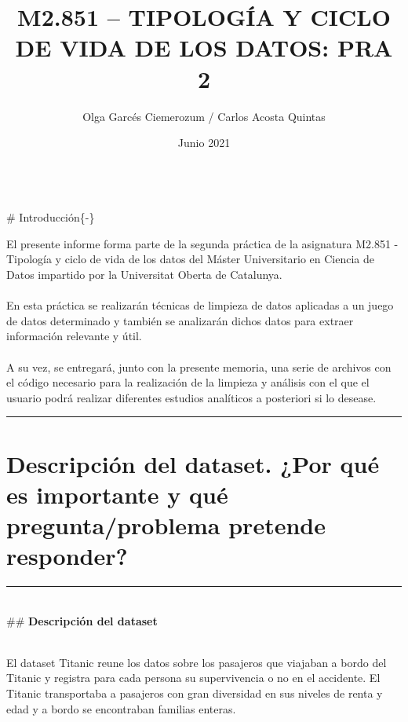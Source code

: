 \documentclass[
]{article}
\title{\textbf{M2.851 -- TIPOLOGÍA Y CICLO DE VIDA DE LOS DATOS: PRA 2}}
\author{Olga Garcés Ciemerozum / Carlos Acosta Quintas}
\date{Junio 2021}
\begin{document}
\maketitle

{
\setcounter{tocdepth}{4}
\tableofcontents
}
\texttt{}

\texttt{}

\texttt{}\\
\# Introducción\{-\}

\texttt{}

El presente informe forma parte de la segunda práctica de la asignatura
M2.851 - Tipología y ciclo de vida de los datos del Máster Universitario
en Ciencia de Datos impartido por la Universitat Oberta de Catalunya.\\
\texttt{}~\\
En esta práctica se realizarán técnicas de limpieza de datos aplicadas a
un juego de datos determinado y también se analizarán dichos datos para
extraer información relevante y útil.\\
\texttt{}~\\
A su vez, se entregará, junto con la presente memoria, una serie de
archivos con el código necesario para la realización de la limpieza y
análisis con el que el usuario podrá realizar diferentes estudios
analíticos a posteriori si lo desease. \texttt{}\\
\texttt{}

\begin{center}\rule{0.5\linewidth}{0.5pt}\end{center}

\hypertarget{descripciuxf3n-del-dataset.-por-quuxe9-es-importante-y-quuxe9-preguntaproblema-pretende-responder}{%
\section{\texorpdfstring{\textbf{Descripción del dataset. ¿Por qué es
importante y qué pregunta/problema pretende
responder?}}{Descripción del dataset. ¿Por qué es importante y qué pregunta/problema pretende responder?}}\label{descripciuxf3n-del-dataset.-por-quuxe9-es-importante-y-quuxe9-preguntaproblema-pretende-responder}}

\begin{center}\rule{0.5\linewidth}{0.5pt}\end{center}

\texttt{}\\
\#\# \textbf{Descripción del dataset}

\texttt{}\\
El dataset Titanic reune los datos sobre los pasajeros que viajaban a
bordo del Titanic y registra para cada persona su supervivencia o no en
el accidente. El Titanic transportaba a pasajeros con gran diversidad en
sus niveles de renta y edad y a bordo se encontraban familias enteras.
\texttt{}
\end{document}
